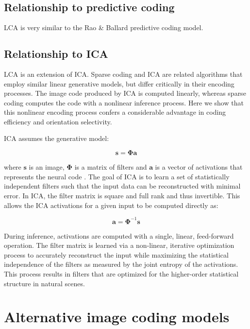 \subsection{Relationship to predictive coding}
LCA is very similar to the Rao & Ballard predictive coding model.


\subsection{Relationship to ICA}
LCA is an extension of ICA.
Sparse coding and ICA are related algorithms that employ similar linear generative models, but differ critically in their encoding processes. The image code produced by ICA is computed linearly, whereas sparse coding computes the code with a nonlinear inference process. Here we show that this nonlinear encoding process confers a considerable advantage in coding efficiency and orientation selectivity.

ICA assumes the generative model:

\begin{equation}
\mathbf{s} = \mathbf{\Phi a}
\end{equation}

where $\mathbf{s}$ is an image, $\mathbf{\Phi}$ is a matrix of filters and $\mathbf{a}$ is a vector of activations that represents the neural code \cite{bell:1997gx}. The goal of ICA is to learn a set of statistically independent filters such that the input data can be reconstructed with minimal error. In ICA, the filter matrix is square and full rank and thus invertible. This allows the ICA activations for a given input to be computed directly as:

\begin{equation}
\mathbf{\hat{a}} = \mathbf{\Phi}^{-1}\mathbf{s}
\end{equation}

During inference, activations are computed with a single, linear, feed-forward operation. The filter matrix is learned via a non-linear, iterative optimization process to accurately reconstruct the input while maximizing the statistical independence of the filters as measured by the joint entropy of the activations. This process results in filters that are optimized for the higher-order statistical structure in natural scenes.


\section{Alternative image coding models}


